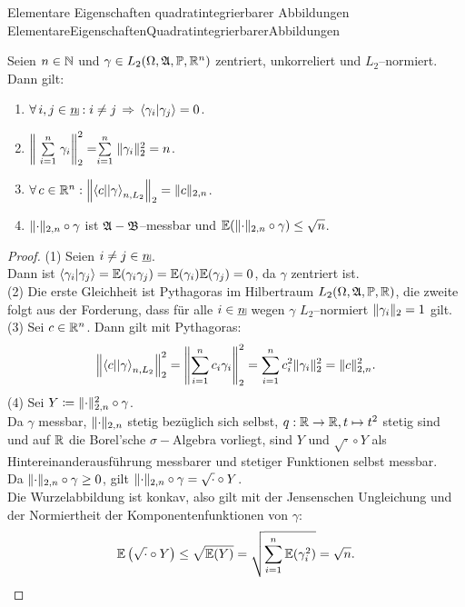 \begin{lemma}{Elementare Eigenschaften quadratintegrierbarer Abbildungen}
             {ElementareEigenschaftenQuadratintegrierbarerAbbildungen}

Seien $n \in \N$ und $\gamma \in L_2(\Omega, \mfa, \Prim, \R^n)$ zentriert,
unkorreliert und $L_2$--normiert.\\
Dann gilt:
\begin{enumerate}[(1)]
	\item \label{ElementareEigenschaftenQuadratintegrierbarerAbbildungen1}
 $\forall\, i, j \in \haken n : i\neq j\folgt\sprod{\gamma_i}{\gamma_j}=0$.
\item\label{ElementareEigenschaftenQuadratintegrierbarerAbbildungen2}
 $\bigg\|\Sum{i=1}n \gamma_i\bigg\|_2^2=\Sum{i=1}n \norm{\gamma_i}_2^2= n$.
\item\label{ElementareEigenschaftenQuadratintegrierbarerAbbildungen3}
 $\forall\, c \in \R^n: \norma{\bprod c \gamma_{n, L_2}}_2=\norm c_{2, n}$.
\item\label{ElementareEigenschaftenQuadratintegrierbarerAbbildungen4}
 $\norm\cdot_{2, n} \circ\gamma$ ist $\mfa-\mfb$--messbar und
    $\E(\norm\cdot_{2, n} \circ \gamma) \le \sqrt n$.
\end{enumerate}
\end{lemma}
\begin{proof}
(1) Seien $i \neq j \in \haken n$.\\
Dann ist $\sprod {\gamma_i} {\gamma_j}
= \E(\gamma_i\gamma_j) = \E(\gamma_i)\E(\gamma_j) = 0$, da $\gamma$ zentriert
ist.\\
(2) Die erste Gleichheit ist Pythagoras im Hilbertraum 
$L_2(\Omega, \mfa, \Prim, \R)$, die zweite folgt aus der Forderung, dass für
alle $i \in \haken n$ wegen $\gamma$ $L_2$--normiert $\norm{\gamma_i}_2 = 1$
gilt.\\
(3) Sei $c \in \R^n$. Dann gilt mit Pythagoras:
\[\norma{\bprod c \gamma _{n, L_2}}_2^2 = \norma{\sum_{i=1}^nc_i\gamma_i}_2^2
= \sum_{i=1}^n c_i^2 \norm{\gamma_i}_2^2 = \norm c _{2, n}^2\text.\]
(4) Sei $Y \coloneqq  \norm\cdot_{2,n}^2 \circ \gamma$.\\
Da $\gamma$ messbar,
$\norm\cdot_{2, n}$ stetig bezüglich sich selbst, $q: \R \rightarrow \R,
t\mapsto t^2$ stetig sind und auf $\R$ die Borel'sche $\sigma-$Algebra
vorliegt, sind $Y$ und $\sqrt\cdot \circ Y$ als Hintereinanderausführung
messbarer und stetiger Funktionen selbst messbar.\\
Da $\norm\cdot_{2, n} \circ \gamma \ge 0$, gilt
$\norm\cdot_{2, n} \circ \gamma = \sqrt\cdot \circ Y$.\\
Die Wurzelabbildung ist konkav, also gilt mit der Jensenschen Ungleichung und
der Normiertheit der Komponentenfunktionen von $\gamma$:
\[\E\left(\sqrt\cdot \circ Y\right) \le \sqrt{\E(Y)} 
= \sqrt{\sum_{i=1}^n\E(\gamma_i^2)} = \sqrt n\text.\]
\end{proof}